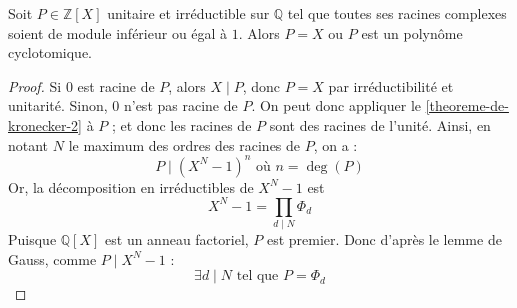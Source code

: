 	\begin{corollary}
		Soit $P \in \mathbb{Z}[X]$ unitaire et irréductible sur $\mathbb{Q}$ tel que toutes ses racines complexes soient de module inférieur ou égal à $1$. Alors $P = X$ ou $P$ est un polynôme cyclotomique.
	\end{corollary}

	\begin{proof}
		Si $0$ est racine de $P$, alors $X \mid P$, donc $P = X$ par irréductibilité et unitarité. Sinon, $0$ n'est pas racine de $P$. On peut donc appliquer le \cref{theoreme-de-kronecker-2} à $P$ ; et donc les racines de $P$ sont des racines de l'unité. Ainsi, en notant $N$ le maximum des ordres des racines de $P$, on a :
		\[ P \mid (X^N - 1)^n \text{ où } n = \deg(P) \]
		Or, la décomposition en irréductibles de $X^N - 1$ est
		\[ X^N - 1 = \prod_{d \mid N} \Phi_d \]
		Puisque $\mathbb{Q}[X]$ est un anneau factoriel, $P$ est premier. Donc d'après le lemme de Gauss, comme $P \mid X^N - 1$ :
		\[ \exists d \mid N \text{ tel que } P = \Phi_d \]
	\end{proof}

